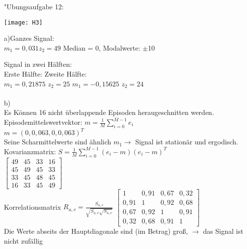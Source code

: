 \documentclass[fleqn,a4paper,12pt]{article}
\begin{document}
	"Ubungsaufgabe 12: \newline
	
	\texttt{[image: H3]}
	
	a)Ganzes Signal:\\
	$m_1 = 0,031		z_2 = 49$ \hspace{1cm}
	Median = 0,	Modalwerte: $\pm $10
	
	Signal in zwei H\"alften:\\
	Erste H\"alfte:	\hspace{5cm}										Zweite H\"alfte:\\
	$m_1 = 0,21875$  $z_2 = 25$	\hspace{4cm}								$m_1 = -0,15625$  $z_2 = 24$\\
	\\
	b)\\
	Es K\"onnen 16 nicht \"uberlappende Episoden heraugeschnitten werden.
	Episodemittelswertvektor: $m = \frac{1}{M}\sum_{i=0}^{M-1}e_i$\\
	$m = (0, 0,063, 0, 0,063)^T$\\
	Seine Scharmittelwerte sind \"ahnlich $m_1 \rightarrow$ Signal ist  station\"ar und ergodisch.
	\newpage
	Kovarianzmatrix: $S = \frac{1}{M}\sum_{i=0}^{M-1}(e_i-m)(e_i-m)^T$\\
	$
	\begin{bmatrix}
	49   & 45 & 33	 &  16 \\
	45 & 49 	& 45	 &  33 \\
	33  & 45	& 48 	 & 45 \\
	16 & 33	& 45	 &  49
	\end{bmatrix}
	$\\
	Korrelationsmatrix $R_{u,v} = \frac{S_{u,v}}{\sqrt{S_{u,v} \sqrt{S_{u,v}}}}$
	$
	\begin{bmatrix}
	1   & 0,91 & 0,67	 &  0,32 \\
	0,91 & 1 	& 0,92	 &  0,68 \\
	0,67 & 0,92	& 1 	 & 0,91 \\
	0,32 & 0,68	& 0,91	 &  1
	\end{bmatrix}
	$\\Die Werte abseits der Hauptdiagonale sind (im Betrag) gro{\ss}, $\rightarrow$ das Signal ist nicht  zuf\"allig\\
	
\end{document}
